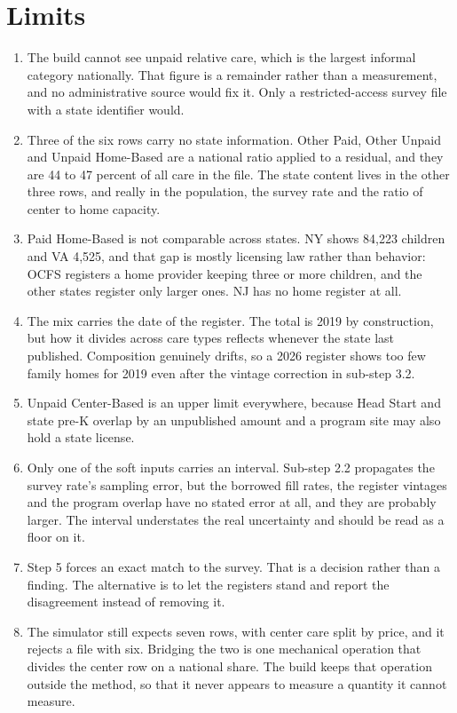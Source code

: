 \documentclass[11pt]{article}
\begin{document}
\section{Limits}

\begin{enumerate}
\setlength{\itemsep}{0.45em}
\item The build cannot see unpaid relative care, which is the largest informal
      category nationally. That figure is a remainder rather than a measurement,
      and no administrative source would fix it. Only a restricted-access survey
      file with a state identifier would.

\item Three of the six rows carry no state information. Other Paid, Other Unpaid
      and Unpaid Home-Based are a national ratio applied to a residual, and they
      are 44 to 47 percent of all care in the file. The state content lives in
      the other three rows, and really in the population, the survey rate and the
      ratio of center to home capacity.

\item Paid Home-Based is not comparable across states. NY shows 84,223 children
      and VA 4,525, and that gap is mostly licensing law rather than behavior:
      OCFS registers a home provider keeping three or more children, and the
      other states register only larger ones. NJ has no home register at all.

\item The mix carries the date of the register. The total is 2019 by
      construction, but how it divides across care types reflects whenever the
      state last published. Composition genuinely drifts, so a 2026 register
      shows too few family homes for 2019 even after the vintage correction in
      sub-step 3.2.

\item Unpaid Center-Based is an upper limit everywhere, because Head Start and
      state pre-K overlap by an unpublished amount and a program site may also
      hold a state license.

\item Only one of the soft inputs carries an interval. Sub-step 2.2 propagates
      the survey rate's sampling error, but the borrowed fill rates, the
      register vintages and the program overlap have no stated error at all,
      and they are probably larger. The interval understates the real
      uncertainty and should be read as a floor on it.

\item Step 5 forces an exact match to the survey. That is a decision rather than
      a finding. The alternative is to let the registers stand and report the
      disagreement instead of removing it.

\item The simulator still expects seven rows, with center care split by price,
      and it rejects a file with six. Bridging the two is one mechanical
      operation that divides the center row on a national share. The build keeps
      that operation outside the method, so that it never appears to measure a
      quantity it cannot measure.
\end{enumerate}
\end{document}
